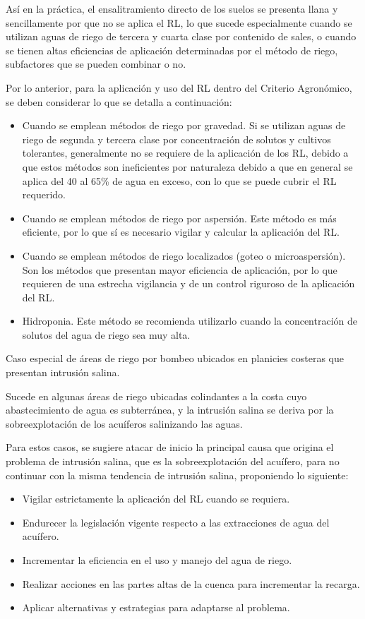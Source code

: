 Así en la práctica, el ensalitramiento directo de los suelos se presenta llana y sencillamente por que no se aplica el RL, lo que sucede especialmente cuando se utilizan aguas de riego de tercera y cuarta clase por contenido de sales, o cuando se tienen altas eficiencias de aplicación determinadas por el método de riego, subfactores que se pueden combinar o no.

Por lo anterior, para la aplicación y uso del RL dentro del Criterio Agronómico, se deben considerar lo que se detalla a continuación:
\begin{itemize}
    \item Cuando se emplean métodos de riego por gravedad. Si se utilizan aguas de riego de segunda y tercera clase por concentración de solutos y cultivos tolerantes, generalmente no se requiere de la aplicación de los RL, debido a que estos métodos son ineficientes por naturaleza debido a que en general se aplica del 40 al 65\% de agua en exceso, con lo que se puede cubrir el RL requerido.
    \item Cuando se emplean métodos de riego por aspersión. Este método es más eficiente, por lo que sí es necesario vigilar y calcular la aplicación del RL.
    \item Cuando se emplean métodos de riego localizados (goteo o microaspersión). Son los métodos que presentan mayor eficiencia de aplicación, por lo que requieren de una estrecha vigilancia y de un control riguroso de la aplicación del RL.
    \item Hidroponia. Este método se recomienda utilizarlo cuando la concentración de solutos del agua de riego sea muy alta.
\end{itemize}
Caso especial de áreas de riego por bombeo ubicados en planicies costeras que presentan intrusión salina.

Sucede en algunas áreas de riego ubicadas colindantes a la costa cuyo abastecimiento de agua es subterránea, y la intrusión salina se deriva por la sobreexplotación de los acuíferos salinizando las aguas.

Para estos casos, se sugiere atacar de inicio la principal causa que origina el problema de intrusión salina, que es la sobreexplotación del acuífero, para no continuar con la misma tendencia de intrusión salina, proponiendo lo siguiente:
\begin{itemize}
    \item Vigilar estrictamente la aplicación del RL cuando se requiera.
    \item Endurecer la legislación vigente respecto a las extracciones de agua del acuífero.
    \item Incrementar la eficiencia en el uso y manejo del agua de riego.
    \item Realizar acciones en las partes altas de la cuenca para incrementar la recarga.
    \item Aplicar alternativas y estrategias para adaptarse al problema.    
\end{itemize}

